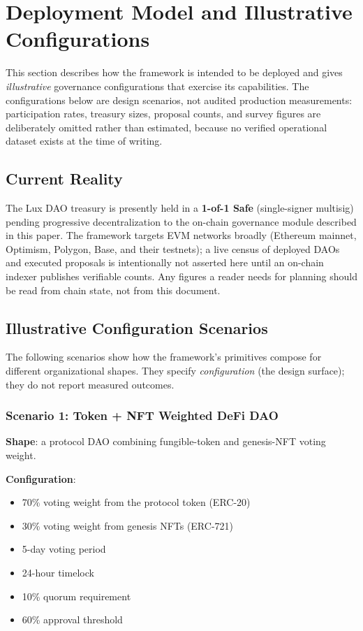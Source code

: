 \section{Deployment Model and Illustrative Configurations}

This section describes how the framework is intended to be deployed and
gives \emph{illustrative} governance configurations that exercise its
capabilities. The configurations below are design scenarios, not audited
production measurements: participation rates, treasury sizes, proposal
counts, and survey figures are deliberately omitted rather than
estimated, because no verified operational dataset exists at the time of
writing.

\subsection{Current Reality}

The Lux DAO treasury is presently held in a \textbf{1-of-1 Safe}
(single-signer multisig) pending progressive decentralization to the
on-chain governance module described in this paper. The framework
targets EVM networks broadly (Ethereum mainnet, Optimism, Polygon, Base,
and their testnets); a live census of deployed DAOs and executed
proposals is intentionally not asserted here until an on-chain indexer
publishes verifiable counts. Any figures a reader needs for planning
should be read from chain state, not from this document.

\subsection{Illustrative Configuration Scenarios}

The following scenarios show how the framework's primitives compose for
different organizational shapes. They specify \emph{configuration}
(the design surface); they do not report measured outcomes.

\subsubsection{Scenario 1: Token + NFT Weighted DeFi DAO}

\textbf{Shape}: a protocol DAO combining fungible-token and
genesis-NFT voting weight.

\textbf{Configuration}:
\begin{itemize}
    \item 70\% voting weight from the protocol token (ERC-20)
    \item 30\% voting weight from genesis NFTs (ERC-721)
    \item 5-day voting period
    \item 24-hour timelock
    \item 10\% quorum requirement
    \item 60\% approval threshold
\end{itemize}

